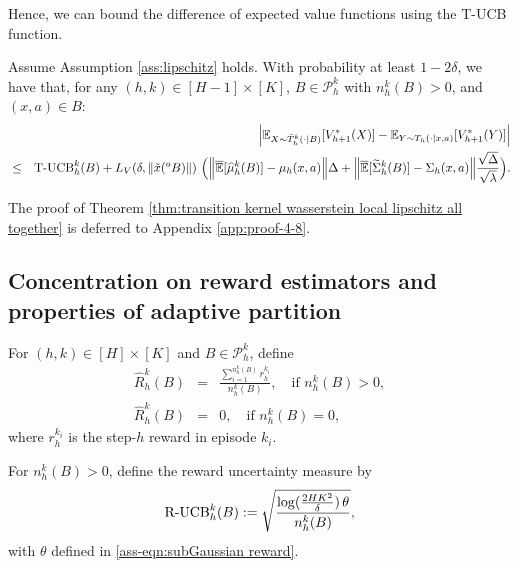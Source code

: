 \documentclass[final,supplement]{siamart251216}
\begin{document}
Hence, we can bound the difference of expected value functions using the T-UCB function.
\begin{theorem}\label{thm:transition kernel wasserstein local lipschitz all together}
Assume Assumption \ref{ass:lipschitz} 
holds. With probability at least $1-2\delta$, we have that, for any $(h,k)  \in [H-1] \times [K]$, $B \in \mathcal{P}_h^k$ with $n_h^k(B)>0$, and $(x,a) \in B$:
\begin{eqnarray}
     &&\hspace{12mm}\left|\mathbb{E}_{X \sim \bar{T}_{h}^{k}(\cdot|B)}[V_{h+1}^{*}(X)]- \mathbb{E}_{Y \sim {T}_{h}(\cdot|x,a)}[V_{h+1}^{*}(Y)]\right|\label{eq:transition kernel wasserstein local lipschitz all together}\\
     &\leq&  \mbox{\rm T-UCB}_{h}^{k}(B)
     +L_{V}(\delta, \|\tilde{x}(^{o}B)\|)\,\,\Big(\Big\|\overline{\mathbb{E}}[\widehat{\mu}_{h}^{k}(B)]-\mu_{h}(x,a)\Big\|\Delta+\Big\|\overline{\mathbb{E}}[\widetilde{\Sigma}_{h}^{k}(B)]-\Sigma_h(x,a)\Big\|\frac{\sqrt{\Delta}}{\sqrt{\lambda}}\Big).\nonumber
\end{eqnarray}
\end{theorem}



The proof of Theorem \ref{thm:transition kernel wasserstein local lipschitz all together} is deferred to Appendix \ref{app:proof-4-8}.


\subsection{Concentration on reward estimators and properties of adaptive partition}
For $(h,k)\in[H]\times[K]$ and $B\in\mathcal P_h^k$, define
\begin{eqnarray}\label{eq:reward function estimator}
    \widehat{R}_{h}^{k} (B)&=&\frac{\sum_{i=1}^{n_h^k(B)}r_{h}^{k_{i}}}{n_h^k(B)},\quad \mbox{if}\,\,  n_h^k(B)>0,\nonumber\\
 \widehat{R}_{h}^{k} (B)&=&0,\quad \mbox{if} \,\, n_h^k(B)=0,
\end{eqnarray}
where $r_h^{k_i}$ is the step-$h$ reward in episode $k_i$.



For $n_h^k(B)>0$, define the reward uncertainty measure by
\begin{eqnarray}\label{eq:RUCB definition}
    \mbox{\rm R-UCB}_{h}^{k}(B):=\sqrt{\frac{\log(\frac{2HK^{2}}{\delta})\,\theta}{n_h^k(B)}},
\end{eqnarray}
with $\theta$ defined in \eqref{ass-eqn:subGaussian reward}.
\end{document}

